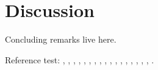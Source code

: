 \section{Discussion}
\label{sec:discussion}

Concluding remarks live here.

Reference test:
\cite{ArcherWest2003},
\cite{BarrettJolleyetal2010},
\cite{Chaetal2009},
\cite{Chuetal2006},
\cite{Clarketal2011},
\cite{Grishkoetal2010},
\cite{Halletal1996},
\cite{Hille2001},
\cite{HorriganAldrich2002},
\cite{LesageLazdunski2000},
\cite{Lewisetal2011},
\cite{Maleckaretal2009},
\cite{MillwardSadleretal2000}
\cite{Nygrenetal1998},
\cite{Poole1997}
\cite{RadhakrishnanHindmarsh1993},
\cite{Scholz2002},
\cite{Sugimotoetal1996},
\cite{Tsugaetal2001},
\cite{UNKNOWN}.

